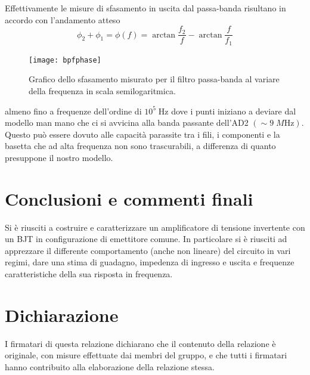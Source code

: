 \documentclass[10pt,a4paper]{article}
\begin{document}
Effettivamente le misure di sfasamento in uscita dal passa-banda risultano
in accordo con l'andamento atteso
\begin{equation}
\phi_2 + \phi_1 = \phi(f) = \arctan{\frac{f_2}{f}} - \arctan{\frac{f}{f_1}}
\end{equation}
\begin{figure}[htb]
\centering
\texttt{[image: bpfphase]}
\caption{Grafico dello sfasamento misurato per il filtro passa-banda al
variare della frequenza in scala semilogaritmica.}
\end{figure}
almeno fino a frequenze dell'ordine di $10^5 \; \si{\Hz}$ dove i punti
iniziano a deviare dal modello man mano che ci si avvicina alla banda
passante dell'AD2 $(\sim 9 \; \si{M\Hz})$. Questo può essere dovuto alle
capacità parassite tra i fili, i componenti e la basetta che ad alta
frequenza non sono trascurabili, a differenza di quanto presuppone il nostro
modello.
\fi

\section*{Conclusioni e commenti finali}
Si è riusciti a costruire e caratterizzare un amplificatore di tensione
invertente con un BJT in configurazione di emettitore comune. In particolare
si è riusciti ad apprezzare il differente comportamento (anche non lineare)
del circuito in vari regimi, dare una stima di guadagno, impedenza di
ingresso e uscita e frequenze caratteristiche della sua risposta in frequenza.

\section*{Dichiarazione}
I firmatari di questa relazione dichiarano che il contenuto della relazione \`e
originale, con misure effettuate dai membri del gruppo, e che tutti i firmatari
hanno contribuito alla elaborazione della relazione stessa.
\end{document}
